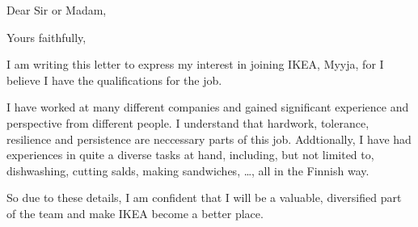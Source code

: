 \documentclass[11pt,a4paper,sans]{moderncv}
\begin{document}
  \clearpage
  \date{March 15, 2020}
  \opening{Dear Sir or Madam,}
  \closing{Yours faithfully,}
  \makelettertitle

  I am writing this letter to express my interest in joining IKEA,
  Myyja, for
  I believe I have the qualifications for the job.

  I have worked at many different companies and gained significant experience and perspective
  from different people. I understand that hardwork, tolerance, resilience and persistence
  are neccessary parts of this job. Addtionally, I have had experiences in quite
  a diverse tasks at hand, including, but not limited to, dishwashing, cutting
  salds, making sandwiches, \ldots, all in the Finnish way.

  So due to these details, I am confident that I will be a valuable, diversified
  part of the team and make IKEA become a better place.

  \makeletterclosing
\end{document}
